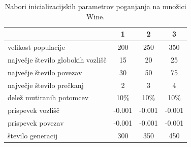\begin{table}[H]
    \begin{center}
        \begin{tabular}{||l c c c||}
            \hline
            & 1      & 2      & 3 \\ [0.5ex]
            \hline
            velikost populacije               & 200    & 250    & 350    \\
            \hline
            največje število globokih vozlišč & 15     & 20     & 25     \\
            \hline
            največje število povezav          & 30     & 50     & 75     \\
            \hline
            največje število prečkanj         & 2      & 3      & 4      \\
            \hline
            delež mutiranih potomcev          & 10\%   & 10\%   & 10\%   \\
            \hline
            prispevek vozlišč                 & -0.001 & -0.001 & -0.001 \\
            \hline
            prispevek povezav                 & -0.001 & -0.001 & -0.001 \\
            \hline
            število generacij                 & 300    & 350    & 450    \\
            \hline
        \end{tabular}
    \end{center}
    \caption{Nabori inicializacijskih parametrov poganjanja na množici Wine.}
    \label{tab:param_wine}
\end{table}

